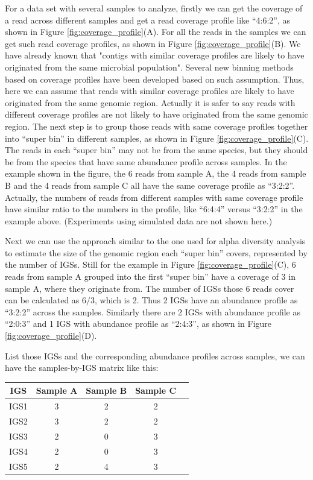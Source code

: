 For a data set with several samples to analyze, firstly we can get the coverage of a read across different samples and get a read coverage
profile like ``4:6:2'', as shown in Figure \ref{fig:coverage_profile}(A). 
For all the reads in the samples we can get such read coverage profiles, as 
shown in Figure \ref{fig:coverage_profile}(B). 
We have already known that "contigs with similar coverage profiles are likely
to have originated from the same microbial population"\cite{Imelfort2014}.
Several new binning methods based on coverage profiles have been developed
based on such assumption\cite{Albertsen2013,Karlsson2013,Alneberg2014,Nielsen2014,Imelfort2014}.
Thus, here we can assume that reads with similar coverage profiles are 
likely to have originated from the same genomic region. Actually it is safer to 
say reads with different coverage profiles are not likely to have originated from
the same genomic region. The next step is to group those reads with same
coverage profiles together into ``super bin'' in different samples, as shown 
in Figure \ref{fig:coverage_profile}(C). The reads in each ``super bin'' may 
not be from the same species, but they should be from the species that have
same abundance profile across samples. In the example shown in the figure,
the 6 reads from sample A, the 4 reads from sample B and the 4 reads from
sample C all have the same coverage profile as ``3:2:2''. Actually, the 
numbers of reads from different samples with same coverage profile have 
similar ratio to the numbers in the profile, like ``6:4:4''
versus ``3:2:2'' in the example above. (Experiments using simulated data are not
shown here.)
 
Next we can use the approach similar to the one used for alpha diversity analysis
to estimate the size of the genomic region each ``super bin'' covers, represented
by the number of IGSs. Still for the example in Figure \ref{fig:coverage_profile}(C),
6 reads from sample A grouped into the first ``super bin'' have a coverage of 3 
in sample A, where they originate from. The number of IGSs those 6 reads cover can be calculated as $6/3$, which is 2. 
Thus 2 IGSs have an abundance profile as ``3:2:2'' across the samples.
Similarly there are 2 IGSs with abundance profile as ``2:0:3'' and 1 IGS 
with abundance profile as ``2:4:3'', as shown in Figure \ref{fig:coverage_profile}(D).

List those IGSs and the corresponding abundance profiles across samples,
we can have the samples-by-IGS matrix like this:
\newline
\begin{tabular}{ |c | c |c| c|c| }
    IGS & Sample A & Sample B & Sample C\\
\hline 
IGS1 & 3 & 2 & 2\\ 
IGS2 & 3 & 2 & 2\\ 
IGS3 & 2 & 0 & 3\\ 
IGS4 & 2 & 0 & 3\\ 
IGS5 & 2 & 4 & 3\\ 
\end{tabular}


